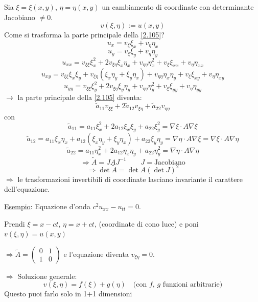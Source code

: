 \documentclass[a4paper,11pt]{report}
\begin{document}
Sia $\xi=\xi(x,y)$, $\eta=\eta(x,y)$ un cambiamento di coordinate con determinante Jacobiano $\neq 0$.
\[
v(\xi,\eta):=u(x,y)
\]
Come si trasforma la parte principale della \eqref{2.105}?
\[
u_x=v_\xi \xi_x + v_\eta \eta_x
\]
\[
u_y=v_\xi \xi_y + v_\eta \eta_y
\]
\[
u_{xx}=v_{\xi \xi}\xi_x^2 + 2v_{\xi\eta}\xi_x\eta_x + v_{\eta\eta}\eta_x^2 + v_\xi \xi_{xx} +v_\eta \eta_{xx}
\]
\[
u_{xy}= v_{\xi \xi}\xi_x\xi_y + v_{\xi\eta}(\xi_x\eta_y + \xi_y\eta_x) + v_{\eta\eta} \eta_x\eta_y + v_\xi \xi_{xy} + v_\eta \eta_{xy}
\]
\[
u_{yy}= v_{\xi\xi }\xi_y^2 + 2v_{\xi\eta}\xi_y\eta_y + v_{\eta\eta}\eta_y^2 + v_\xi \xi_{yy} + v_\eta \eta_{yy}
\]
$\rightarrow$ la parte principale della \eqref{2.105} diventa: 
\[
\tilde{a}_{11} v_{\xi\xi} + 2 \tilde{a}_{12}v_{\xi\eta} + \tilde{a}_{22}v_{\eta\eta}
\]
con 
\[
\tilde{a}_{11}= a_{11} \xi_x^2 + 2a_{12}\xi_x\xi_y + a_{22} \xi_y^2 = \nabla\xi \cdot A \nabla \xi
\]
\[
\tilde{a}_{12}= a_{11} \xi_x\eta_x + a_{12}(\xi_x\eta_y+\xi_y\eta_x) + a_{22} \xi_y\eta_y = \nabla \eta \cdot A\nabla \xi = \nabla \xi \cdot A \nabla \eta
\]
\[
\tilde{a}_{22}= a_{11} \eta_x^2 + 2a_{12}\eta_x\eta_y + a_{22} \eta_y^2 = \nabla \eta \cdot A \nabla \eta
\]
\begin{equation}
\Rightarrow \tilde{A} = J A J^{-1} \qquad J=\text{Jacobiano} 
\label{2.117}
\end{equation}
\[
\Rightarrow \det \tilde{A} = \det A (\det J)^2
\]
$\Rightarrow$ le trasformazioni invertibili di coordinate lasciano invariante il carattere dell'equazione.

\underline{Esempio}: Equazione d'onda $c^2u_{xx} - u_{tt}=0$.

Prendi $\xi=x-ct$, $\eta = x+ct$, (coordinate di cono luce) e poni $v(\xi,\eta) = u(x,y)$ 

$\Rightarrow \tilde{A}=\left(\begin{matrix} 0 & 1\\ 1 & 0 \end{matrix}\right)$ e l'equazione diventa $v_{\xi\eta}=0$. 

$\Rightarrow$ Soluzione generale:
\[
v(\xi,\eta)=f(\xi) + g(\eta) \quad \text{(con $f$, $g$ funzioni arbitrarie)}
\]
Questo puoi farlo solo in 1+1 dimensioni
\end{document}
